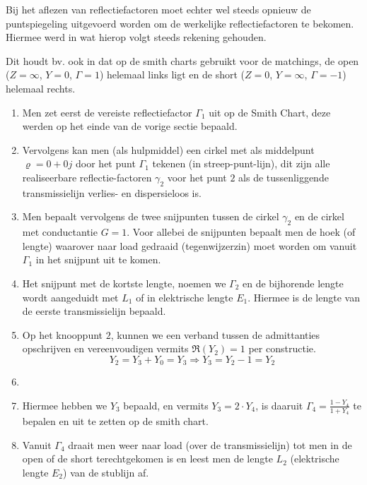   Bij het aflezen van reflectiefactoren moet echter wel steeds opnieuw de
  puntspiegeling uitgevoerd worden om de werkelijke reflectiefactoren te bekomen.
  Hiermee werd in wat hierop volgt steeds rekening gehouden.

  Dit houdt bv. ook in dat op de smith charts gebruikt voor de matchings, de
  open ($Z = \infty$, $Y=0$, $\Gamma = 1$) helemaal links ligt en de short
  ($Z = 0$, $Y = \infty$, $\Gamma = -1$) helemaal rechts.

  \begin{enumerate}
   \item Men zet eerst de vereiste reflectiefactor $\Gamma_1$ uit op de Smith
   Chart, deze werden op het einde van de vorige sectie bepaald.
   \item Vervolgens kan men (als hulpmiddel) een cirkel met als middelpunt $\varrho = 0 + 0j$ door
   het punt $\Gamma_1$ tekenen (in streep-punt-lijn), dit zijn alle realiseerbare
   reflectie-factoren $\gamma_2$ voor het punt $2$ als de tussenliggende
   transmissielijn verlies- en dispersieloos is.
   \item Men bepaalt vervolgens de twee snijpunten tussen de cirkel $\gamma_2$
   en de cirkel met conductantie $G = 1$. Voor allebei de snijpunten
   bepaalt men de hoek (of lengte) waarover naar load gedraaid (tegenwijzerzin)
   moet worden om vanuit $\Gamma_1$ in het snijpunt uit te komen.
   \item Het snijpunt met de kortste lengte, noemen we $\Gamma_2$ en de bijhorende
   lengte wordt aangeduidt met $L_1$ of in elektrische lengte $E_1$. Hiermee is
   de lengte van de eerste transmissielijn bepaald.
   \item Op het knooppunt $2$, kunnen we een verband tussen de admittanties opschrijven
   en vereenvoudigen vermits $\Re{(Y_2)} = 1$ per constructie.
   \[
     Y_2 = Y_3 + Y_0 = Y_3 \Rightarrow Y_3 = Y_2 - 1 = Y_2
   \]
   \item {}
   \item Hiermee hebben we $Y_3$ bepaald, en vermits $Y_3 = 2 \cdot Y_4$,
   is daaruit $\Gamma_4 = \frac{1-Y_4}{1+Y_4}$ te bepalen en uit te zetten
   op de smith chart.
   \item Vanuit $\Gamma_4$ draait men weer naar load (over de transmissielijn)
   tot men in de open of de short terechtgekomen is en leest men de lengte
   $L_2$ (elektrische lengte $E_2$) van de stublijn af.   
  \end{enumerate}


